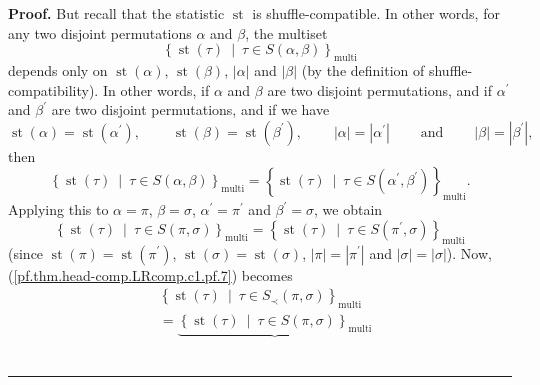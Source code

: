 \documentclass[numbers=enddot,12pt,final,onecolumn,notitlepage]{scrartcl}%
\theoremstyle{definition}
\newenvironment{proof}[1][Proof]{\noindent\textbf{#1.} }{\ \rule{0.5em}{0.5em}}
\begin{document}
\begin{proof}
But recall that the statistic $\operatorname*{st}$ is shuffle-compatible. In
other words, for any two disjoint permutations $\alpha$ and $\beta$, the
multiset%
\[
\left\{  \operatorname*{st}\left(  \tau\right)  \ \mid\ \tau\in S\left(
\alpha,\beta\right)  \right\}  _{\operatorname*{multi}}%
\]
depends only on $\operatorname*{st}\left(  \alpha\right)  $,
$\operatorname*{st}\left(  \beta\right)  $, $\left\vert \alpha\right\vert $
and $\left\vert \beta\right\vert $ (by the definition of
shuffle-compatibility). In other words, if $\alpha$ and $\beta$ are two
disjoint permutations, and if $\alpha^{\prime}$ and $\beta^{\prime}$ are two
disjoint permutations, and if we have%
\[
\operatorname*{st}\left(  \alpha\right)  =\operatorname*{st}\left(
\alpha^{\prime}\right)  ,\ \ \ \ \ \ \ \ \ \ \operatorname*{st}\left(
\beta\right)  =\operatorname*{st}\left(  \beta^{\prime}\right)
,\ \ \ \ \ \ \ \ \ \ \left\vert \alpha\right\vert =\left\vert \alpha^{\prime
}\right\vert \ \ \ \ \ \ \ \ \ \ \text{and}\ \ \ \ \ \ \ \ \ \ \left\vert
\beta\right\vert =\left\vert \beta^{\prime}\right\vert ,
\]
then%
\[
\left\{  \operatorname*{st}\left(  \tau\right)  \ \mid\ \tau\in S\left(
\alpha,\beta\right)  \right\}  _{\operatorname*{multi}}=\left\{
\operatorname*{st}\left(  \tau\right)  \ \mid\ \tau\in S\left(  \alpha
^{\prime},\beta^{\prime}\right)  \right\}  _{\operatorname*{multi}}.
\]
Applying this to $\alpha=\pi$, $\beta=\sigma$, $\alpha^{\prime}=\pi^{\prime}$
and $\beta^{\prime}=\sigma$, we obtain
\begin{equation}
\left\{  \operatorname*{st}\left(  \tau\right)  \ \mid\ \tau\in S\left(
\pi,\sigma\right)  \right\}  _{\operatorname*{multi}}=\left\{
\operatorname*{st}\left(  \tau\right)  \ \mid\ \tau\in S\left(  \pi^{\prime
},\sigma\right)  \right\}  _{\operatorname*{multi}}
\label{pf.thm.head-comp.LRcomp.c1.pf.9}%
\end{equation}
(since $\operatorname*{st}\left(  \pi\right)  =\operatorname*{st}\left(
\pi^{\prime}\right)  $, $\operatorname*{st}\left(  \sigma\right)
=\operatorname*{st}\left(  \sigma\right)  $, $\left\vert \pi\right\vert
=\left\vert \pi^{\prime}\right\vert $ and $\left\vert \sigma\right\vert
=\left\vert \sigma\right\vert $). Now, (\ref{pf.thm.head-comp.LRcomp.c1.pf.7})
becomes%
\begin{align*}
&  \left\{  \operatorname*{st}\left(  \tau\right)  \ \mid\ \tau\in S_{\prec
}\left(  \pi,\sigma\right)  \right\}  _{\operatorname*{multi}}\\
&  =\underbrace{\left\{  \operatorname*{st}\left(  \tau\right)  \ \mid
\ \tau\in S\left(  \pi,\sigma\right)  \right\}  _{\operatorname*{multi}}%
}
\end{align*}
\end{proof}
\end{document}
